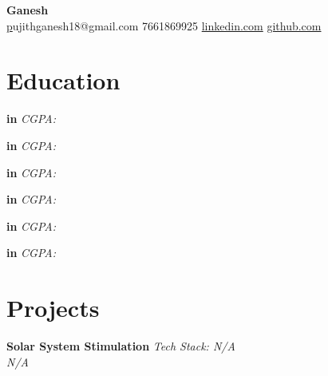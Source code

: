 \documentclass[a4paper,10pt]{article}
\begin{document}
\begin{center}
    {\huge \textbf{ Ganesh }} \\
    \vspace{5pt}
    \small \href{mailto:pujithganesh18@gmail.com } pujithganesh18@gmail.com \quad \textbullet{} 7661869925 \quad  \quad \textbullet{} \href{ https://www.linkedin.com/in/ganesh10-/ }{linkedin.com} \quad \textbullet{} \href{  }{github.com}
\end{center}

\section*{Education}

\noindent
\textbf{  in  } \hfill  \textit{ CGPA:  } \\
  \hfill  \textit  
\vspace{0.3cm}

\noindent
\textbf{  in  } \hfill  \textit{ CGPA:  } \\
  \hfill  \textit  
\vspace{0.3cm}

\noindent
\textbf{  in  } \hfill  \textit{ CGPA:  } \\
  \hfill  \textit  
\vspace{0.3cm}

\noindent
\textbf{  in  } \hfill  \textit{ CGPA:  } \\
  \hfill  \textit  
\vspace{0.3cm}

\noindent
\textbf{  in  } \hfill  \textit{ CGPA:  } \\
  \hfill  \textit  
\vspace{0.3cm}

\noindent
\textbf{  in  } \hfill  \textit{ CGPA:  } \\
  \hfill  \textit  
\vspace{0.3cm}



\section*{Projects}

\noindent
\textbf{ Solar System Stimulation } \hfill \textit{Tech Stack: N/A } \\
\vspace{5pt} \textit{ N/A }
\begin{compactitem}
    \item 
\end{compactitem}
\end{document}
